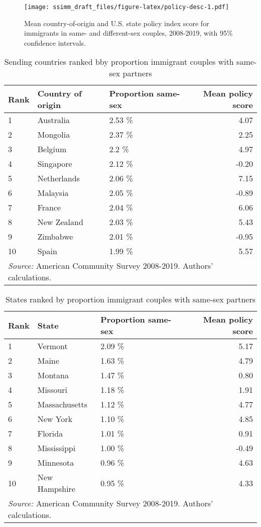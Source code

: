 \documentclass[
  11pt,
]{article}
\begin{document}
\begin{figure}
\centering
\texttt{[image: ssimm\_draft\_files/figure-latex/policy-desc-1.pdf]}
\caption{\label{fig:policy-desc}Mean country-of-origin and U.S. state policy index score for immigrants in same- and different-sex couples, 2008-2019, with 95\% confidence intervals.}
\end{figure}

\begin{table}

\caption{\label{tab:country-tab}Sending countries ranked bby proportion immigrant couples with same-sex partners}
\centering
\begin{tabular}[t]{lllr}
\toprule
Rank & Country of origin & Proportion same-sex & Mean policy score\\
\midrule
1 & Australia & 2.53 \% & 4.07\\
2 & Mongolia & 2.37 \% & 2.25\\
3 & Belgium & 2.2 \% & 4.97\\
4 & Singapore & 2.12 \% & -0.20\\
5 & Netherlands & 2.06 \% & 7.15\\
6 & Malaysia & 2.05 \% & -0.89\\
7 & France & 2.04 \% & 6.06\\
8 & New Zealand & 2.03 \% & 5.43\\
9 & Zimbabwe & 2.01 \% & -0.95\\
10 & Spain & 1.99 \% & 5.57\\
\bottomrule
\multicolumn{4}{l}{\rule{0pt}{1em}\textit{Source:} American Community Survey 2008-2019. Authors' calculations.}\\
\end{tabular}
\end{table}

\begin{table}

\caption{\label{tab:state-tab}States ranked by proportion immigrant couples with same-sex partners}
\centering
\begin{tabular}[t]{lllr}
\toprule
Rank & State & Proportion same-sex & Mean policy score\\
\midrule
1 & Vermont & 2.09 \% & 5.17\\
2 & Maine & 1.63 \% & 4.79\\
3 & Montana & 1.47 \% & 0.80\\
4 & Missouri & 1.18 \% & 1.91\\
5 & Massachusetts & 1.12 \% & 4.77\\
6 & New York & 1.10 \% & 4.85\\
7 & Florida & 1.01 \% & 0.91\\
8 & Mississippi & 1.00 \% & -0.49\\
9 & Minnesota & 0.96 \% & 4.63\\
10 & New Hampshire & 0.95 \% & 4.33\\
\bottomrule
\multicolumn{4}{l}{\rule{0pt}{1em}\textit{Source:} American Community Survey 2008-2019. Authors' calculations.}\\
\end{tabular}
\end{table}
\end{document}
